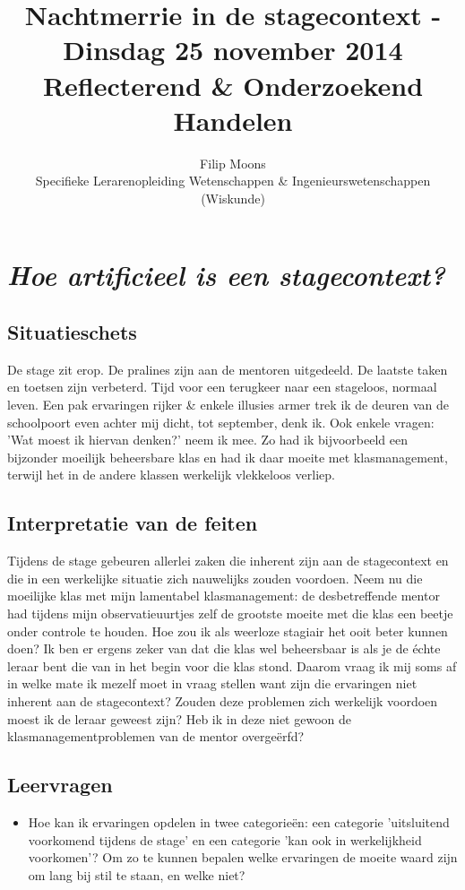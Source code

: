 \documentclass[10pt,a4paper]{article}
\theoremstyle{definition}
\theoremstyle{remark}
\begin{document}
\title{Nachtmerrie in de stagecontext - Dinsdag 25 november 2014 \\Reflecterend \& Onderzoekend Handelen}
\author{Filip Moons\\Specifieke Lerarenopleiding Wetenschappen \& Ingenieurswetenschappen (Wiskunde)}
\maketitle
\section{\emph{Hoe artificieel is een stagecontext?}}

\subsection{Situatieschets}
De stage zit erop. De pralines zijn aan de mentoren uitgedeeld. De laatste taken en toetsen zijn verbeterd. Tijd voor een terugkeer naar een stageloos, normaal leven. Een pak ervaringen rijker & enkele illusies armer trek ik de deuren van de schoolpoort even achter mij dicht, tot september, denk ik. Ook enkele vragen: 'Wat moest ik hiervan denken?' neem ik mee. Zo had ik bijvoorbeeld een bijzonder moeilijk beheersbare klas en had ik daar moeite met klasmanagement, terwijl het in de andere klassen werkelijk vlekkeloos verliep.

\subsection{Interpretatie van de feiten}
Tijdens de stage gebeuren allerlei zaken die inherent zijn aan de stagecontext en die in een werkelijke situatie zich nauwelijks zouden voordoen. Neem nu die moeilijke klas met mijn lamentabel klasmanagement: de desbetreffende mentor had tijdens mijn observatieuurtjes zelf de grootste moeite met die klas een beetje onder controle te houden. Hoe zou ik als weerloze stagiair het ooit beter kunnen doen? Ik ben er ergens zeker van dat die klas wel beheersbaar is als je de échte leraar bent die van in het begin voor die klas stond. Daarom vraag ik mij soms af in welke mate ik mezelf moet in vraag stellen want zijn die ervaringen niet inherent aan de stagecontext? Zouden deze problemen zich werkelijk voordoen moest ik de leraar geweest zijn? Heb ik in deze niet gewoon de klasmanagementproblemen van de mentor overgeërfd?  
\subsection{Leervragen}
\begin{itemize}
  \item Hoe kan ik ervaringen opdelen in twee categorieën: een categorie 'uitsluitend voorkomend tijdens de stage' en een categorie 'kan ook in werkelijkheid voorkomen'? Om zo te kunnen bepalen welke ervaringen de moeite waard zijn om lang bij stil te staan, en welke niet?    
 \end{itemize}

 
\end{document}
